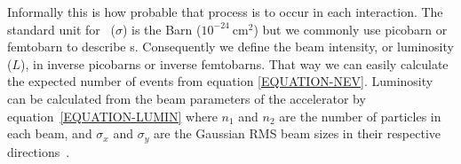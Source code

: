 Informally this is how probable that process is to occur in each interaction. The standard unit for \xs~($\sigma$) is the Barn ($10^{-24}\ $cm$^{2}$) but we commonly use picobarn or femtobarn to describe \xs s. Consequently we define the beam intensity, or luminosity ($L$), in inverse picobarns or inverse femtobarns. That way we can easily calculate the expected number of events from equation \ref{EQUATION-NEV}. Luminosity can be calculated from the beam parameters of the accelerator by equation~\ref{EQUATION-LUMIN} where $n_1$ and $n_2$ are the number of particles in each beam, and $\sigma_x$ and $\sigma_y$ are the Gaussian RMS beam sizes in their respective directions~\cite{QFT-PS}.






